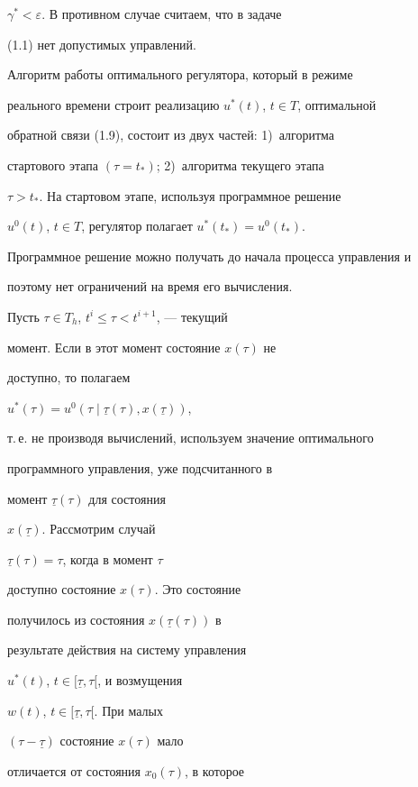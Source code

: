$\gamma^* < \varepsilon$. В противном случае считаем, что в задаче


(1.1) нет допустимых управлений.





Алгоритм работы оптимального регулятора, который в режиме


реального времени строит реализацию $u^*(t)$, $t \in T$, оптимальной


обратной связи (1.9), состоит из двух частей: 1)~алгоритма


стартового этапа $(\tau=t_*)$; 2)~алгоритма текущего этапа


$\tau>t_*$. На стартовом этапе, используя программное решение


$u^0(t)$, $t \in T$, регулятор полагает $u^*(t_*)=u^0(t_*)$.


Программное решение можно получать до начала процесса управления и


поэтому нет ограничений на время его вычисления.





Пусть $\tau \in T_h$, $t ^i \le \tau < t^{i+1}$, --- текущий


момент. Если в этот момент состояние $x(\tau)$ не


доступно, то полагаем


$u^*(\tau)=u^0(\tau\mid\underline{\tau}(\tau), x(\underline{\tau}))$,


т.\,е. не производя вычислений, используем значение оптимального


программного управления, уже подсчитанного в


момент $\underline{\tau}(\tau)$ для состояния


$x(\underline{\tau})$. Рассмотрим случай


$\underline{\tau}(\tau)=\tau$, когда в момент $\tau$


доступно состояние $x(\tau)$. Это состояние


получилось из состояния $x(\underline{\tau}(\tau))$ в


результате действия на систему управления


$u^*(t)$, $t \in [\underline{\tau}, \tau[$, и возмущения


$w(t)$, $t \in [\underline{\tau}, \tau[$. При малых


$(\tau-\underline{\tau})$ состояние $x(\tau)$ мало


отличается от состояния $x_{0}(\tau)$, в которое


